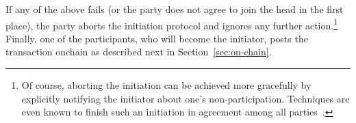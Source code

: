 If any of the above fails (or the party does not agree to join the head in the
first place), the party aborts the initiation protocol and ignores any further
action.\footnote{Of course, aborting the initiation can be achieved more
  gracefully by explicitly notifying the initiator about one's
  non-participation. Techniques are even known to finish such an initiation in
  agreement among all parties~\cite{PODC:FGHHS02}.} Finally, one of the
participants, who will become the initiator, posts the \mtxInit{} transaction
onchain as described next in Section~\ref{sec:on-chain}.



